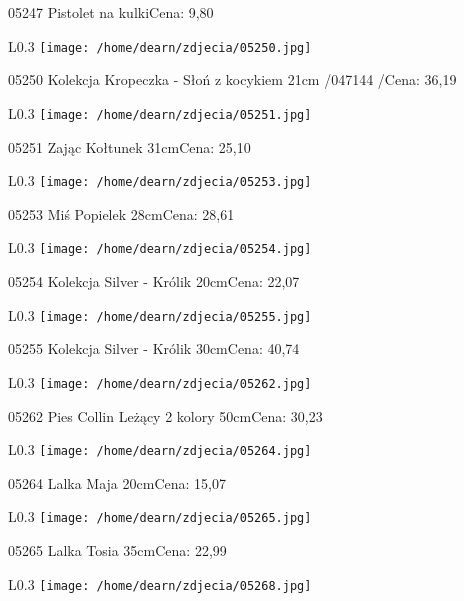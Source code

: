 05247 Pistolet na kulkiCena: 9,80\newline
\begin{wrapfigure}{L}{0.3\textwidth}
\texttt{[image: /home/dearn/zdjecia/05250.jpg]}
\end{wrapfigure}
05250 Kolekcja Kropeczka - Słoń z kocykiem 21cm  /047144 /Cena: 36,19\newline
\begin{wrapfigure}{L}{0.3\textwidth}
\texttt{[image: /home/dearn/zdjecia/05251.jpg]}
\end{wrapfigure}
05251 Zając Kołtunek 31cmCena: 25,10\newline
\begin{wrapfigure}{L}{0.3\textwidth}
\texttt{[image: /home/dearn/zdjecia/05253.jpg]}
\end{wrapfigure}
05253 Miś Popielek 28cmCena: 28,61\newline
\begin{wrapfigure}{L}{0.3\textwidth}
\texttt{[image: /home/dearn/zdjecia/05254.jpg]}
\end{wrapfigure}
05254 Kolekcja Silver - Królik 20cmCena: 22,07\newline
\begin{wrapfigure}{L}{0.3\textwidth}
\texttt{[image: /home/dearn/zdjecia/05255.jpg]}
\end{wrapfigure}
05255 Kolekcja Silver - Królik 30cmCena: 40,74\newline
\begin{wrapfigure}{L}{0.3\textwidth}
\texttt{[image: /home/dearn/zdjecia/05262.jpg]}
\end{wrapfigure}
05262 Pies Collin Leżący 2 kolory 50cmCena: 30,23\newline
\begin{wrapfigure}{L}{0.3\textwidth}
\texttt{[image: /home/dearn/zdjecia/05264.jpg]}
\end{wrapfigure}
05264 Lalka Maja 20cmCena: 15,07\newline
\begin{wrapfigure}{L}{0.3\textwidth}
\texttt{[image: /home/dearn/zdjecia/05265.jpg]}
\end{wrapfigure}
05265 Lalka Tosia 35cmCena: 22,99\newline
\begin{wrapfigure}{L}{0.3\textwidth}
\texttt{[image: /home/dearn/zdjecia/05268.jpg]}
\end{wrapfigure}
